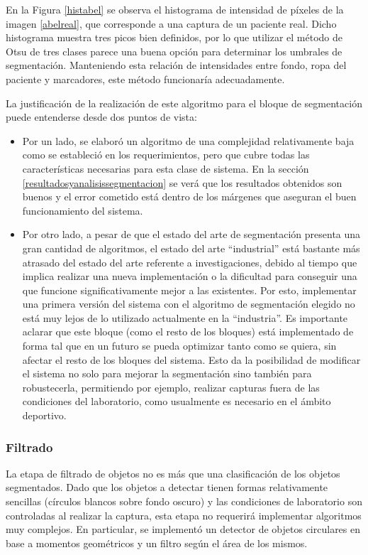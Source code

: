 En la Figura \ref{histabel} se observa el histograma de intensidad de píxeles de la imagen \ref{abelreal}, que corresponde a una captura de un paciente real. Dicho histograma muestra tres picos bien definidos, por lo que utilizar el método de Otsu de tres clases parece una buena opción para determinar los umbrales de segmentación. Manteniendo esta relación de intensidades entre fondo, ropa del paciente y marcadores, este método funcionaría adecuadamente.

La justificación de la realización de este algoritmo para el bloque de segmentación puede entenderse desde dos puntos de vista: 
\begin{itemize}
 \item Por un lado, se elaboró un algoritmo de una complejidad relativamente baja como se estableció en los requerimientos, pero que cubre todas las características necesarias para esta clase de sistema. En la sección \ref{resultadosyanalisissegmentacion} se verá que los resultados obtenidos son buenos y el error cometido está dentro de los márgenes que aseguran el buen funcionamiento del sistema.
 \item Por otro lado, a pesar de que el estado del arte de segmentación presenta una gran cantidad de algoritmos, el estado del arte ``industrial'' está bastante más atrasado del estado del arte referente a investigaciones, debido al tiempo que implica realizar una nueva implementación o la dificultad para conseguir una que funcione significativamente mejor a las existentes. Por esto, implementar una primera versión del sistema con el algoritmo de segmentación elegido no está muy lejos de lo utilizado actualmente en la ``industria''. Es importante aclarar que este bloque (como el resto de los bloques) está implementado de forma tal que en un futuro se pueda optimizar tanto como se quiera, sin afectar el resto de los bloques del sistema. Esto da la posibilidad de  modificar el sistema no solo para mejorar la segmentación sino también para robustecerla, permitiendo por ejemplo, realizar capturas fuera de las condiciones del laboratorio, como usualmente es necesario en el ámbito deportivo.
\end{itemize}

\subsubsection{Filtrado}
 La etapa de filtrado de objetos no es más que una clasificación de los objetos segmentados. Dado que los objetos a detectar tienen formas relativamente sencillas (círculos blancos sobre fondo oscuro) y las condiciones de laboratorio son controladas al realizar la captura, esta etapa no requerirá implementar algoritmos muy complejos. En particular, se implementó un detector de objetos circulares en base a momentos geométricos\cite{imageMoments} y un filtro según el área de los mismos.

